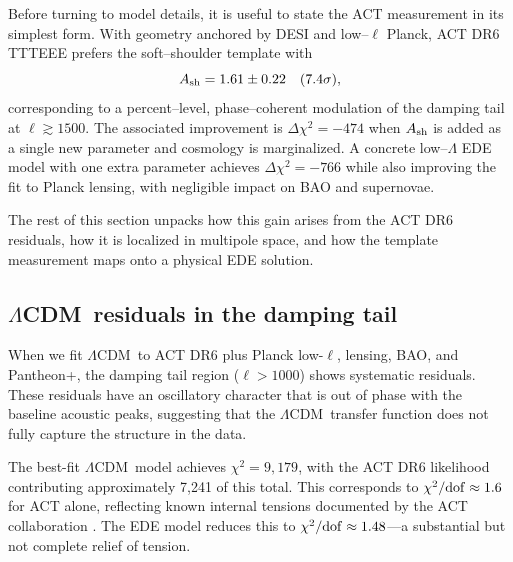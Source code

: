 \documentclass[twocolumn,showpacs,preprintnumbers,amsmath,amssymb,prd]{revtex4-2}
\newcommand{\lcdm}{$\Lambda$CDM}
\begin{document}
Before turning to model details, it is useful to state the ACT measurement in
its simplest form. With geometry anchored by DESI and low--$\ell$ Planck, ACT
DR6 TTTEEE prefers the soft--shoulder template with
\begin{equation}
A_{\rm sh} = 1.61 \pm 0.22 \quad (7.4\sigma),
\end{equation}
corresponding to a percent--level, phase--coherent modulation of the damping
tail at $\ell \gtrsim 1500$. The associated improvement is
$\Delta\chi^2 = -474$ when $A_{\rm sh}$ is added as a single new parameter and
cosmology is marginalized. A concrete low--$\Lambda$ EDE model with one extra 
parameter achieves $\Delta\chi^2 = -766$ while also improving the fit
to Planck lensing, with negligible impact on BAO and supernovae.

The rest of this section unpacks how this gain arises from the ACT DR6
residuals, how it is localized in multipole space, and how the template
measurement maps onto a physical EDE solution.

\subsection{\lcdm\ residuals in the damping tail}

When we fit \lcdm\ to ACT DR6 plus Planck low-$\ell$, lensing, BAO, and Pantheon+, 
the damping tail region ($\ell > 1000$) shows systematic residuals. These residuals 
have an oscillatory character that is out of phase with the baseline acoustic peaks, 
suggesting that the \lcdm\ transfer function does not fully capture the structure 
in the data.

The best-fit \lcdm\ model achieves $\chi^2 = 9{,}179$, with the ACT DR6 
likelihood contributing approximately 7,241 of this total. This corresponds 
to $\chi^2/{\rm dof} \approx 1.6$ for ACT alone, reflecting known internal 
tensions documented by the ACT collaboration \cite{ACT2024}. The EDE model 
reduces this to $\chi^2/{\rm dof} \approx 1.48$---a substantial but not 
complete relief of tension.
\end{document}
